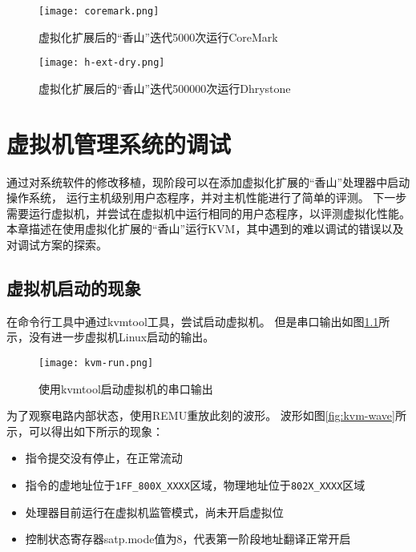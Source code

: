 \begin{figure}[htbp]
    \centering
\texttt{[image: coremark.png]}
\caption{虚拟化扩展后的“香山”迭代5000次运行CoreMark}
\label{fig:coremark}
\end{figure}

\begin{figure}[htbp]
    \centering
\texttt{[image: h-ext-dry.png]}
    \caption{虚拟化扩展后的“香山”迭代500000次运行Dhrystone}
    \label{fig:dry}
\end{figure}

\chapter{虚拟机管理系统的调试}
通过对系统软件的修改移植，现阶段可以在添加虚拟化扩展的“香山”处理器中启动操作系统，
运行主机级别用户态程序，并对主机性能进行了简单的评测。
下一步需要运行虚拟机，并尝试在虚拟机中运行相同的用户态程序，以评测虚拟化性能。
本章描述在使用虚拟化扩展的“香山”运行KVM，其中遇到的难以调试的错误以及对调试方案的探索。

\section{虚拟机启动的现象}
在命令行工具中通过kvmtool工具，尝试启动虚拟机。
但是串口输出如图\ref{fig:kvm-run}所示，没有进一步虚拟机Linux启动的输出。

\begin{figure}[htbp]
    \centering
    \texttt{[image: kvm-run.png]}
    \caption{使用kvmtool启动虚拟机的串口输出}
    \label{fig:kvm-run}
\end{figure}

为了观察电路内部状态，使用REMU重放此刻的波形。
波形如图\ref{fig:kvm-wave}所示，可以得出如下所示的现象：

\begin{itemize}
    \item 指令提交没有停止，在正常流动
    \item 指令的虚地址位于\verb|1FF_800X_XXXX|区域，物理地址位于\verb|802X_XXXX|区域
    \item 处理器目前运行在虚拟机监管模式，尚未开启虚拟位
    \item 控制状态寄存器satp.mode值为8，代表第一阶段地址翻译正常开启
\end{itemize}

